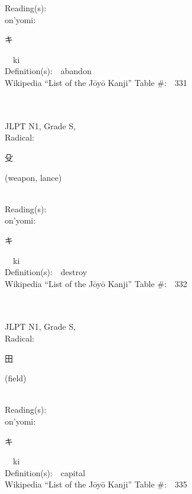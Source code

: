 \begin{multicols}{2}
Reading(s):\ \ \\
{\hspace*{1em}}on'yomi:\ \ \\
{\hspace*{2em}}{\begin{CJK}{UTF8}{min} キ \end{CJK}}\ \ ki\ \ \\
Definition(s):\ \ abandon \\
Wikipedia ``List of the J\=oy\=o Kanji'' Table \#:\ \ 331 \\
\ \ \\
{\fontsize{34pt}{40pt}  }\ \ \\
{JLPT N1, Grade S, \\Radical:\ \ {\begin{CJK}{UTF8}{min} 殳 \end{CJK}} (weapon, lance) } \\
Reading(s):\ \ \\
{\hspace*{1em}}on'yomi:\ \ \\
{\hspace*{2em}}{\begin{CJK}{UTF8}{min} キ \end{CJK}}\ \ ki\ \ \\
Definition(s):\ \ destroy \\
Wikipedia ``List of the J\=oy\=o Kanji'' Table \#:\ \ 332 \\
\ \ \\
{\fontsize{34pt}{40pt}  }\ \ \\
{JLPT N1, Grade S, \\Radical:\ \ {\begin{CJK}{UTF8}{min} 田 \end{CJK}} (field) } \\
Reading(s):\ \ \\
{\hspace*{1em}}on'yomi:\ \ \\
{\hspace*{2em}}{\begin{CJK}{UTF8}{min} キ \end{CJK}}\ \ ki\ \ \\
Definition(s):\ \ capital \\
Wikipedia ``List of the J\=oy\=o Kanji'' Table \#:\ \ 335 \\

\end{multicols}
